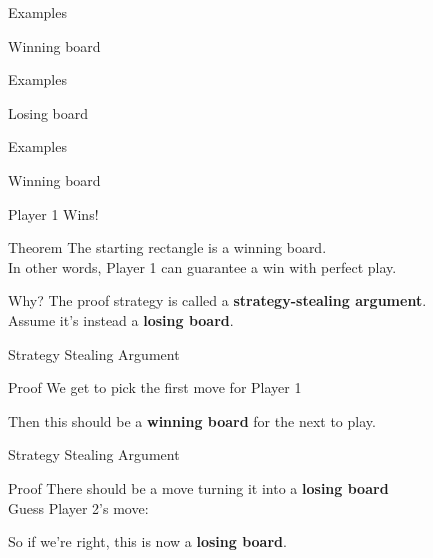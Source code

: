 \documentclass{beamer}
\begin{document}
\begin{frame}{Examples}
  \begin{block}{Winning board}
    \begin{center}
    \end{center}
  \end{block}
\end{frame}

\begin{frame}{Examples}
  \begin{block}{Losing board}
    \begin{center}
    \end{center}
  \end{block}
\end{frame}

\begin{frame}{Examples}
  \begin{block}{Winning board}
    \begin{center}
    \end{center}
  \end{block}
\end{frame}

\begin{frame}{Player 1 Wins!}
\pause
  \begin{block}{Theorem}
    The starting rectangle is a winning board.\\
    In other words, {\color{blue} Player 1} can guarantee a win with perfect play.
  \end{block}
\pause
  \begin{block}{Why?}
    The proof strategy is called a \textbf{strategy-stealing argument}.\\
    Assume it's instead a \textbf{losing board}.
  \end{block}
\end{frame}

\begin{frame}{Strategy Stealing Argument}
\pause
  \begin{block}{Proof}
\pause
    We get to pick the first move for {\color{blue}Player 1}
\pause
    \begin{center}
    \end{center}
\pause
    Then this should be a \textbf{winning board} for the next to play.
  \end{block}
\end{frame}

\begin{frame}{Strategy Stealing Argument}
  \begin{block}{Proof}
    There should be a move turning it into a \textbf{losing board}\\
\pause
    Guess {\color{red}Player 2}'s move:
    \begin{center}
    \end{center}
\pause
    So if we're right, this is now a \textbf{losing board}.
  \end{block}
\end{frame}
\end{document}
